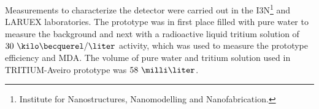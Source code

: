 Measurements to characterize the detector were carried out in the I3N\footnote{Institute for Nanostructures, Nanomodelling and Nanofabrication.} and LARUEX laboratories. The prototype was in first place filled with pure water to measure the background and next with a radioactive liquid tritium solution of $30~\kilo\becquerel/\liter$ activity, which was used to measure the prototype efficiency and MDA. The volume of pure water and tritium solution used in TRITIUM-Aveiro prototype was $58~\milli\liter$. 






